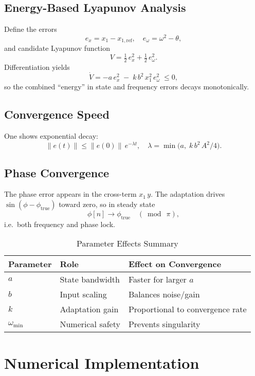 \documentclass{article}
\begin{document}
\subsection{Energy-Based Lyapunov Analysis}
Define the errors
\[
e_x = x_1 - x_{1,\mathrm{ref}}, 
\quad
e_\omega = \omega^2 - \theta,
\]
and candidate Lyapunov function
\[
V = \tfrac12\,e_x^2 + \tfrac12\,e_\omega^2.
\]
Differentiation yields
\[
\dot{V} = -a\,e_x^2 \;-\; k\,b^2\,x_1^2\,e_\omega^2 \;\le 0,
\]
so the combined “energy” in state and frequency errors decays monotonically.

\subsection{Convergence Speed}
One shows exponential decay:
\[
\|e(t)\|\le \|e(0)\|\,e^{-\lambda t},\quad
\lambda = \min\bigl(a,\;k\,b^2\,A^2/4\bigr).
\]

\subsection{Phase Convergence}
The phase error appears in the cross-term \(x_1\,y\).  The adaptation drives 
\(\sin(\phi-\phi_{\mathrm{true}})\) toward zero, so in steady state
\[
\phi[n]\to\phi_{\mathrm{true}}\quad (\bmod\ \pi),
\]
i.e.\ both frequency and phase lock.

\begin{table}[h]
\centering
\caption{Parameter Effects Summary}
\begin{tabular}{lll}
Parameter       & Role               & Effect on Convergence            \\
\hline
$a$              & State bandwidth    & Faster for larger \(a\)          \\
$b$              & Input scaling      & Balances noise/gain              \\
$k$              & Adaptation gain    & Proportional to convergence rate \\
$\omega_{\min}$ & Numerical safety   & Prevents singularity             \\
\end{tabular}
\end{table}

\section{Numerical Implementation}
\end{document}
